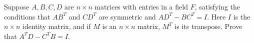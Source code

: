 Suppose $A,B,C,D$ are $n \times n$ matrices with entries in a field
$F$, satisfying the conditions that $AB^T$ and $CD^T$ are symmetric and
$AD^T - BC^T = I$. Here $I$ is the $n \times n$ identity matrix, and
if $M$ is an $n \times n$ matrix, $M^T$ is its transpose. Prove that
$A^T D - C^T B = I$.
